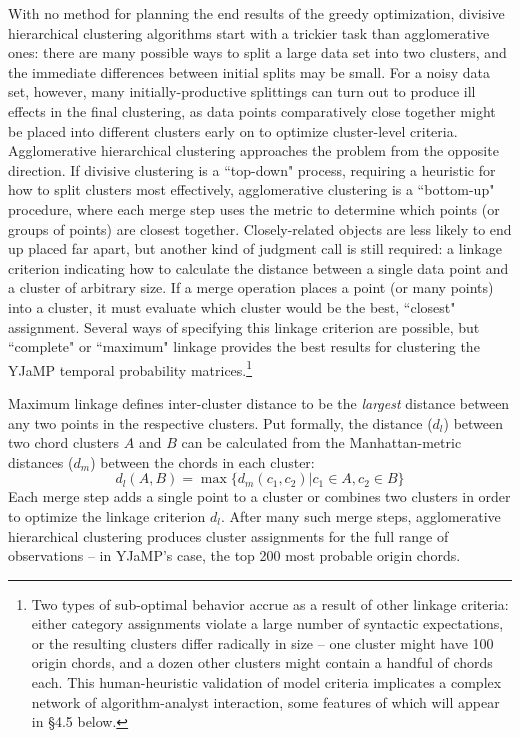 With no method for planning the end results of the greedy optimization, divisive hierarchical clustering algorithms start with a trickier task than agglomerative ones: there are many possible ways to split a large data set into two clusters, and the immediate differences between initial splits may be small.  For a noisy data set, however, many initially-productive splittings can turn out to produce ill effects in the final clustering, as data points comparatively close together might be placed into different clusters early on to optimize cluster-level criteria.  Agglomerative hierarchical clustering approaches the problem from the opposite direction.  If divisive clustering is a ``top-down" process, requiring a heuristic for how to split clusters most effectively, agglomerative clustering is a ``bottom-up" procedure, where each merge step uses the metric to determine which points (or groups of points) are closest together.  Closely-related objects are less likely to end up placed far apart, but another kind of judgment call is still required: a linkage criterion indicating how to calculate the distance between a single data point and a cluster of arbitrary size.  If a merge operation places a point (or many points) into a cluster, it must evaluate which cluster would be the best, ``closest" assignment.  Several ways of specifying this linkage criterion are possible, but ``complete" or ``maximum" linkage provides the best results for clustering the YJaMP temporal probability matrices.\footnote{Two types of sub-optimal behavior accrue as a result of other linkage criteria: either category assignments violate a large number of syntactic expectations, or the resulting clusters differ radically in size -- one cluster might have 100 origin chords, and a dozen other clusters might contain a handful of chords each.  This human-heuristic validation of model criteria implicates a complex network of algorithm-analyst interaction, some features of which will appear in \S 4.5 below.}

Maximum linkage defines inter-cluster distance to be the \emph{largest} distance between any two points in the respective clusters.  Put formally, the distance ($d_l$) between two chord clusters $A$ and $B$ can be calculated from the Manhattan-metric distances ($d_m$) between the chords in each cluster:
\begin{equation}
\label{eq:d_l}
d_l(A,B) = \max \{ d_m(c_1,c_2) \vert c_1 \in A, c_2 \in B \}
\end{equation}
Each merge step adds a single point to a cluster or combines two clusters in order to optimize the linkage criterion $d_l$.  After many such merge steps, agglomerative hierarchical clustering produces cluster assignments for the full range of observations -- in YJaMP's case, the top 200 most probable origin chords.


